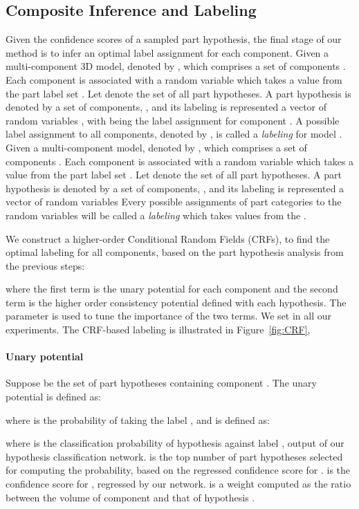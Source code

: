 \documentclass[acmtog]{acmart}
\newcommand{\new}[1]{{\color{black}#1}}
\begin{document}
\subsection{Composite Inference and Labeling}
\label{sec:labelling}
\new{
Given the confidence scores of a sampled part hypothesis,
the final stage of our method is to infer an optimal label assignment for each component.
Given a multi-component 3D model, denoted by , which comprises a set of components .
Each component  is associated with a random variable 
which takes a value from the part label set .
Let  denote the set of all part hypotheses.
A part hypothesis  is denoted by a set of components,
, and its labeling is represented
a vector of random variables , with  being the label
assignment for component .
A possible label assignment to all components, denoted by , is called a \textsl{labeling} for model .
\if 0
Given a multi-component model, denoted by , which comprises a set of components .
Each component  is associated with a random variable 
which takes a value from the part label set .
Let  denote the set of all part hypotheses.
A part hypothesis  is denoted by a set of components,
, and its labeling is represented
a vector of random variables 
Every possible assignments of part categories to the random variables  will be called a \textsl{labeling} which takes values from the .
\fi

We construct a higher-order Conditional Random Fields (CRFs),
to find the optimal labeling for all components,
based on the part hypothesis analysis from the previous steps:

where the first term is the unary potential for each component and
the second term is the higher order consistency potential defined with each hypothesis.
The parameter  is used to tune the importance of the two terms.
We set  in all our experiments.
The CRF-based labeling is illustrated in Figure~\ref{fig:CRF},



\paragraph{\textbf{Unary potential}}
Suppose  be the set of part hypotheses containing component .
The unary potential  is defined as:

where  is the probability of  taking the label ,
and is defined as:

where  is the classification probability of hypothesis  against label ,
output of our hypothesis classification network.
 is the top number of part hypotheses selected for computing the probability,
based on the regressed confidence score for .
 is the confidence score for , regressed by our network.
 is a weight computed as the ratio between the volume of component 
and that of hypothesis .





}
\end{document}
